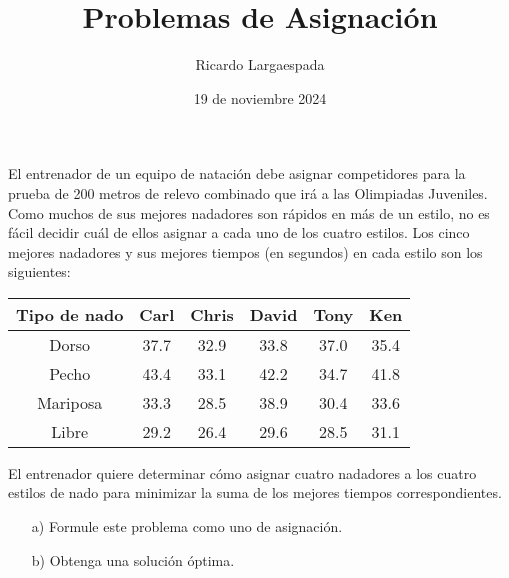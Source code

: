 \documentclass{article}
\title{Problemas de Asignación}
\author{Ricardo Largaespada}
\date{19 de noviembre 2024}
\begin{document}
\maketitle

\vspace{-1cm}
\begin{problem}
El entrenador de un equipo de natación debe asignar competidores para la prueba de 200 metros de relevo combinado que irá a las Olimpiadas Juveniles. Como muchos de sus mejores nadadores son rápidos en más de un estilo, no es fácil decidir cuál de ellos asignar a cada uno de los cuatro estilos. Los cinco mejores nadadores y sus mejores tiempos (en segundos) en cada estilo son los siguientes:

\begin{center}
\begin{tabular}{|c|c|c|c|c|c|}
\hline
\textbf{Tipo de nado} & \textbf{Carl} & \textbf{Chris} & \textbf{David} & \textbf{Tony} & \textbf{Ken} \\
\hline
Dorso & 37.7 & 32.9 & 33.8 & 37.0 & 35.4 \\
\hline
Pecho & 43.4 & 33.1 & 42.2 & 34.7 & 41.8 \\
\hline
Mariposa & 33.3 & 28.5 & 38.9 & 30.4 & 33.6 \\
\hline
Libre & 29.2 & 26.4 & 29.6 & 28.5 & 31.1 \\
\hline
\end{tabular}
\end{center}

El entrenador quiere determinar cómo asignar cuatro nadadores a los cuatro estilos de nado para minimizar la suma de los mejores tiempos correspondientes.

\begin{enumerate}
    \item[a)] Formule este problema como uno de asignación.
    \item[b)] Obtenga una solución óptima.
\end{enumerate}

\end{problem}

\vspace{-1cm}
\end{document}
